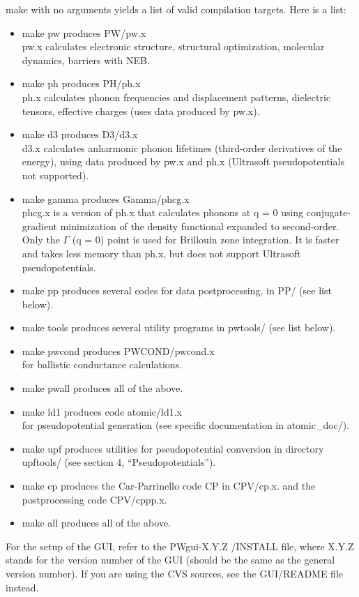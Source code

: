 \documentclass[12pt,a4paper]{article}
\begin{document}
make with no arguments yields a list of valid compilation targets. Here is
a list:
\begin{itemize}
\item make pw produces PW/pw.x\\
pw.x calculates electronic structure, structural optimization, molecular dynamics, barriers with NEB.
\item make ph produces PH/ph.x\\
ph.x calculates phonon frequencies and displacement patterns, dielectric tensors, eﬀective charges (uses data produced by pw.x).
\item make d3 produces D3/d3.x\\
d3.x calculates anharmonic phonon lifetimes (third-order derivatives
of the energy), using data produced by pw.x and ph.x (Ultrasoft
pseudopotentials not supported). 
\item make gamma produces Gamma/phcg.x\\
phcg.x is a version of ph.x that calculates phonons at q = 0 using
conjugate-gradient minimization of the density functional expanded to
second-order. Only the $\Gamma$ (q = 0) point is used for Brillouin zone
integration. It is faster and takes less memory than ph.x, but does
not support Ultrasoft pseudopotentials. 
\item  make pp produces several codes for data postprocessing, in PP/
  (see list below). 
\item make tools produces several utility programs in pwtools/ (see
  list below).  
\item make pwcond produces PWCOND/pwcond.x\\
 for ballistic conductance calculations.
\item make pwall produces all of the above.
\item make ld1 produces code atomic/ld1.x\\
for pseudopotential generation (see specific documentation in atomic\_doc/).
\item make upf produces utilities for pseudopotential conversion in
  directory upftools/ (see section 4, “Pseudopotentials”). 
\item make cp produces the Car-Parrinello code CP in CPV/cp.x. and the
  postprocessing code CPV/cppp.x. 
\item make all produces all of the above.
\end{itemize}
For the setup of the GUI, refer to the PWgui-X.Y.Z /INSTALL file, where
X.Y.Z stands for the version number of the GUI (should be the same as the
general version number). If you are using the CVS sources, see
the GUI/README file instead.
   
\end{document}
